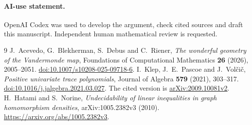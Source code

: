 \documentclass[11pt]{article}
\begin{document}
\paragraph{AI-use statement.}
OpenAI Codex was used to develop the argument, check cited sources and draft
this manuscript. Independent human mathematical review is requested.

\begin{thebibliography}{9}
J.~Acevedo, G.~Blekherman, S.~Debus and C.~Riener,
\emph{The wonderful geometry of the Vandermonde map},
Foundations of Computational Mathematics \textbf{26} (2026), 2005--2051.
\href{https://doi.org/10.1007/s10208-025-09718-6}{doi:10.1007/s10208-025-09718-6}.
I.~Klep, J.~E.~Pascoe and J.~Vol\v{c}i\v{c},
\emph{Positive univariate trace polynomials},
Journal of Algebra \textbf{579} (2021), 303--317.
\href{https://doi.org/10.1016/j.jalgebra.2021.03.027}{doi:10.1016/j.jalgebra.2021.03.027}.
The cited version is \href{https://arxiv.org/abs/2009.10081v2}{arXiv:2009.10081v2}.
H.~Hatami and S.~Norine,
\emph{Undecidability of linear inequalities in graph homomorphism densities},
arXiv:1005.2382v3 (2010).
\url{https://arxiv.org/abs/1005.2382v3}.
\end{thebibliography}
\end{document}
